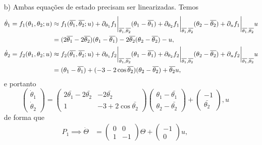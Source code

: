 \begin{itemize}
	\item [b)] 
	Ambas equações de estado precisam ser linearizadas. 
	Temos 
	\begin{align*}
		\dot{\theta}_1 = f_1(\theta_1, \theta_2; u)
		&\approx f_1(\overline{\theta_1}, \overline{\theta_2}; u) 
		+
		\partial_{\theta_1} f_1
		\bigg|_{\overline{\theta_1}, \overline{\theta_2}}
		(\theta_1 - \overline{\theta_1}) 
		+
		\partial_{\theta_2} f_1
		\bigg|_{\overline{\theta_1}, \overline{\theta_2}}
		(\theta_2 - \overline{\theta_2}) 
		+
		\partial_{u} f_1
		\bigg|_{\overline{\theta_1}, \overline{\theta_2}}
		u 
		\\
		&= (2\overline{\theta_1} - 2\overline{\theta_2})(\theta_1 - \overline{\theta_1})
		-2\overline{\theta_2}(\theta_2 - \overline{\theta_2})
		-u, 
		\\
		\dot{\theta}_2 = f_2(\theta_1, \theta_2; u)
		&\approx f_2(\overline{\theta_1}, \overline{\theta_2}; u) 
		+
		\partial_{\theta_1} f_2
		\bigg|_{\overline{\theta_1}, \overline{\theta_2}}
		(\theta_1 - \overline{\theta_1}) 
		+
		\partial_{\theta_2} f_2
		\bigg|_{\overline{\theta_1}, \overline{\theta_2}}
		(\theta_2 - \overline{\theta_2}) 
		+
		\partial_{u} f_2
		\bigg|_{\overline{\theta_1}, \overline{\theta_2}}
		u  
		\\
		&= (\theta_1 - \overline{\theta_1})+
		(-3-2\cos\overline{\theta_2})(\theta_2 - \overline{\theta_2})
		+\overline{\theta_2}u, 
	\end{align*}
	e portanto
	\[
	\begin{pmatrix}
		\dot{\theta}_1 \\ \dot{\theta}_2
	\end{pmatrix}
	= 
	\begin{pmatrix}
		2\bar{\theta_1} - 2\bar{\theta_2} & -2\bar{\theta_2} \\
		1 & -3+2\cos\bar{\theta_2} 
	\end{pmatrix}
	\begin{pmatrix}
		\theta_1 - \bar{\theta_1} \\ \theta_2 - \bar{\theta_2}
	\end{pmatrix}
	+
	\begin{pmatrix}
		-1 \\ \bar{\theta_2}
	\end{pmatrix},
	u
	\]
	de forma que
	\begin{align*}
		P_1 \implies \dot{\Theta} &= 
		\begin{pmatrix} 
			0 & 0 \\ 
			1 & -1
		\end{pmatrix}
		\Theta 
		+
		\begin{pmatrix} -1 \\ 0 \end{pmatrix} u, \\

\end{align*}
\end{itemize}
